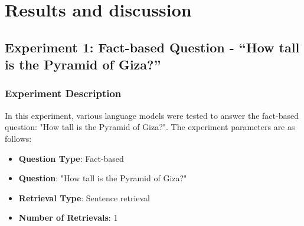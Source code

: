 \documentclass{wseas}
\begin{document}
\begin{table}[htbp]
  \caption{Experiment description} %
  \label{tab:experiment_questions_table}  %
    \centering
\end{table}

    

\section{Results and discussion}

\subsection{Experiment 1: Fact-based Question - ``How tall is the
Pyramid of
Giza?''}

\subsubsection{Experiment Description}
In this experiment, various language models were tested to answer the
fact-based question: "How tall is the Pyramid of Giza?". The
experiment parameters are as follows:

\begin{itemize}
\item
  \textbf{Question Type}: Fact-based
\item
  \textbf{Question}: "How tall is the Pyramid of Giza?"
\item
  \textbf{Retrieval Type}: Sentence retrieval
\item
  \textbf{Number of Retrievals}: 1
\end{itemize}
\end{document}
